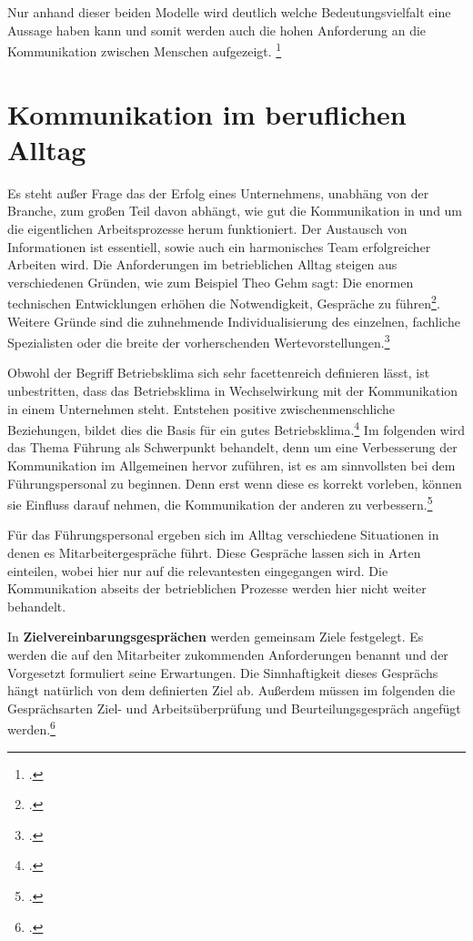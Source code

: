 \documentclass[12pt, DIV9, BCOR9mm, onecolumn, headsepline, ngerman]{scrreprt}
\begin{document}
Nur anhand dieser beiden Modelle wird deutlich welche Bedeutungsvielfalt eine Aussage haben kann und somit werden auch die hohen Anforderung an die Kommunikation zwischen Menschen aufgezeigt.
\footcite[vgl.][S.33f]{SchulzMiteinander}


\section{Kommunikation im beruflichen Alltag} 

Es steht außer Frage das der Erfolg eines Unternehmens, unabhäng von der Branche, zum großen Teil davon abhängt, wie gut die Kommunikation in und um die eigentlichen Arbeitsprozesse herum funktioniert. Der Austausch von Informationen ist essentiell, sowie auch ein harmonisches Team erfolgreicher Arbeiten wird.
Die Anforderungen im betrieblichen Alltag steigen aus verschiedenen Gründen, wie zum Beispiel Theo Gehm sagt: \glqq Die enormen technischen Entwicklungen erhöhen die Notwendigkeit, Gespräche zu führen\grqq\footcite[vgl.][S.21]{GehmKommunikation}. Weitere Gründe sind die zuhnehmende Individualisierung des einzelnen, fachliche Spezialisten oder die breite der vorherschenden Wertevorstellungen.\footcite[vgl.][S.23]{GehmKommunikation}

Obwohl der Begriff Betriebsklima sich sehr facettenreich definieren lässt, ist unbestritten, dass das Betriebsklima in Wechselwirkung mit der Kommunikation in einem Unternehmen steht. Entstehen positive zwischenmenschliche Beziehungen, bildet dies die Basis für ein gutes Betriebsklima.\footcite[vgl.][S.48ff]{SabelSprechen} Im folgenden wird das Thema Führung als Schwerpunkt behandelt, denn um eine Verbesserung der Kommunikation im Allgemeinen hervor zuführen, ist es am sinnvollsten bei dem Führungspersonal zu beginnen. Denn erst wenn diese es korrekt vorleben, können sie Einfluss darauf nehmen, die Kommunikation der anderen zu verbessern.\footcite[vgl.][S.23f]{SchulzMiteinander}

Für das Führungspersonal ergeben sich im Alltag verschiedene Situationen in denen es Mitarbeitergespräche führt. Diese Gespräche lassen sich in Arten einteilen, wobei hier nur auf die relevantesten eingegangen wird. Die Kommunikation abseits der betrieblichen Prozesse werden hier nicht weiter behandelt.

In \textbf{Zielvereinbarungsgesprächen} werden gemeinsam Ziele festgelegt. Es werden die auf den Mitarbeiter zukommenden Anforderungen benannt und der Vorgesetzt formuliert seine Erwartungen. Die Sinnhaftigkeit dieses Gesprächs hängt natürlich von dem definierten Ziel ab. Außerdem müssen im folgenden die Gesprächsarten \glqq Ziel- und Arbeitsüberprüfung\grqq{} und \glqq Beurteilungsgespräch\grqq{}  angefügt werden.\footcite[vgl.][S.51f]{MentzelMitarbeiter}
\end{document}
